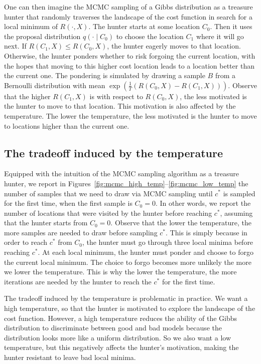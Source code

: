 One can then imagine the MCMC sampling of a Gibbs distribution as a
treasure hunter that randomly traverses the landscape of the cost function
in search for a local minimum of $R(\cdot, X)$. The hunter starts at some location $C_0$. Then it uses the proposal distribution $q(\cdot \mid C_0)$ to choose the location
$C_1$ where it will go next. If $R(C_1, X) \leq R(C_0, X)$, the hunter eagerly
moves to that location. Otherwise, the hunter ponders whether to risk
forgoing the current location, with the hopes that moving to this higher cost
location leads to a location better than the current one. The pondering
is simulated by drawing a sample $B$ from a Bernoulli distribution with
mean $\exp\left(\frac{1}{T}\left(R(C_0, X) - R(C_1, X)\right)\right)$. Observe that the higher $R(C_1, X)$
is with respect to $R(C_0, X)$, the less motivated is the hunter to move to
that location. This motivation is also affected by the temperature. The
lower the temperature, the less motivated is the hunter to move to locations
higher than the current one.

\subsection{The tradeoff induced by the temperature}

Equipped with the intuition of the MCMC sampling algorithm as a treasure
hunter, we report in Figures~\ref{fig:mcmc_high_temp}--\ref{fig:mcmc_low_temp} the number of samples that
we need to draw via MCMC sampling until $c^*$ is sampled for the first time,
when the first sample is $C_0 = 0$. In other words, we report the number
of locations that were visited by the hunter before reaching $c^*$, assuming
that the hunter starts from $C_0 = 0$. Observe that the lower the temperature,
the more samples are needed to draw before sampling $c^*$. This is simply
because in order to reach $c^*$ from $C_0$, the hunter must go through three local
minima before reaching $c^*$. At each local minimum, the hunter must
ponder and choose to forgo the current local minimum. The choice to forgo
becomes more unlikely the more we lower the temperature. This is why
the lower the temperature, the more iterations are needed by the hunter to
reach the $c^*$ for the first time.

The tradeoff induced by the temperature is problematic in practice.
We want a high temperature, so that the hunter is motivated to explore
the landscape of the cost function. However, a high temperature reduces
the ability of the Gibbs distribution to discriminate between good and bad
models because the distribution looks more like a uniform distribution. So
we also want a low temperature, but this negatively affects the hunter's
motivation, making the hunter resistant to leave bad local minima.

